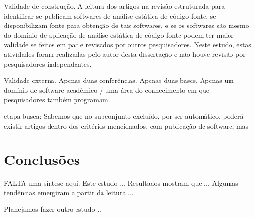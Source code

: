 Validade de construção.
A leitura dos artigos na revisão estruturada para identificar se publicam
softwares de análise estática de código fonte, se disponibilizam fonte para
obtenção de tais softwares, e se os softwares são mesmo do domínio de aplicação
de análise estática de código fonte podem ter maior validade se feitos em
par e revisados por outros pesquisadores.
Neste estudo, estas atividades foram realizadas pelo autor desta dissertação e 
não houve revisão por pesquisadores independentes.

Validade externa. Apenas duas conferências. Apenas duas bases. Apenas um domínio de software acadêmico / uma área do conhecimento em que pesquisadores também programam.

etapa busca: Sabemos que no subconjunto excluído, por ser automático, poderá existir artigos
dentro dos critérios mencionados, com publicação de software, mas 

\section{Conclusões} \label{estudo1:conclusoes}

FALTA uma síntese aqui. 
Este estudo ...
Resultados mostram que ...
Algumas tendências emergiram a partir da leitura ...

Planejamos fazer outro estudo ... 
